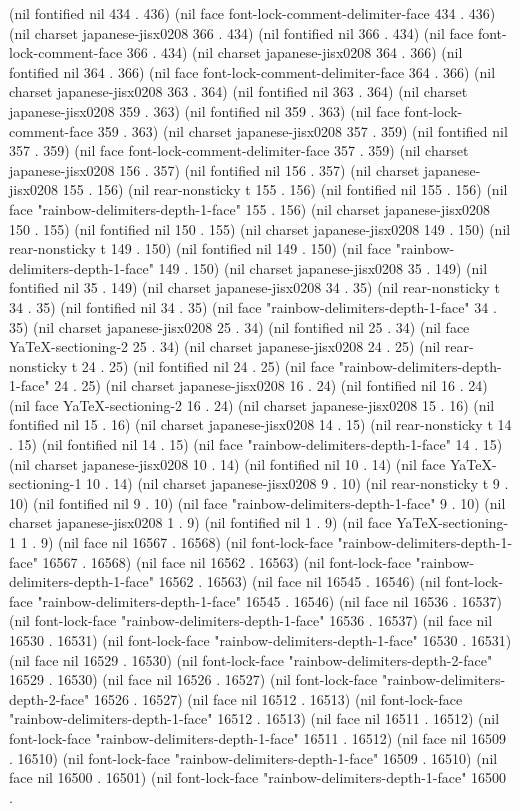 (nil fontified nil 434 . 436) (nil face font-lock-comment-delimiter-face 434 . 436) (nil charset japanese-jisx0208 366 . 434) (nil fontified nil 366 . 434) (nil face font-lock-comment-face 366 . 434) (nil charset japanese-jisx0208 364 . 366) (nil fontified nil 364 . 366) (nil face font-lock-comment-delimiter-face 364 . 366) (nil charset japanese-jisx0208 363 . 364) (nil fontified nil 363 . 364) (nil charset japanese-jisx0208 359 . 363) (nil fontified nil 359 . 363) (nil face font-lock-comment-face 359 . 363) (nil charset japanese-jisx0208 357 . 359) (nil fontified nil 357 . 359) (nil face font-lock-comment-delimiter-face 357 . 359) (nil charset japanese-jisx0208 156 . 357) (nil fontified nil 156 . 357) (nil charset japanese-jisx0208 155 . 156) (nil rear-nonsticky t 155 . 156) (nil fontified nil 155 . 156) (nil face "rainbow-delimiters-depth-1-face" 155 . 156) (nil charset japanese-jisx0208 150 . 155) (nil fontified nil 150 . 155) (nil charset japanese-jisx0208 149 . 150) (nil rear-nonsticky t 149 . 150) (nil fontified nil 149 . 150) (nil face "rainbow-delimiters-depth-1-face" 149 . 150) (nil charset japanese-jisx0208 35 . 149) (nil fontified nil 35 . 149) (nil charset japanese-jisx0208 34 . 35) (nil rear-nonsticky t 34 . 35) (nil fontified nil 34 . 35) (nil face "rainbow-delimiters-depth-1-face" 34 . 35) (nil charset japanese-jisx0208 25 . 34) (nil fontified nil 25 . 34) (nil face YaTeX-sectioning-2 25 . 34) (nil charset japanese-jisx0208 24 . 25) (nil rear-nonsticky t 24 . 25) (nil fontified nil 24 . 25) (nil face "rainbow-delimiters-depth-1-face" 24 . 25) (nil charset japanese-jisx0208 16 . 24) (nil fontified nil 16 . 24) (nil face YaTeX-sectioning-2 16 . 24) (nil charset japanese-jisx0208 15 . 16) (nil fontified nil 15 . 16) (nil charset japanese-jisx0208 14 . 15) (nil rear-nonsticky t 14 . 15) (nil fontified nil 14 . 15) (nil face "rainbow-delimiters-depth-1-face" 14 . 15) (nil charset japanese-jisx0208 10 . 14) (nil fontified nil 10 . 14) (nil face YaTeX-sectioning-1 10 . 14) (nil charset japanese-jisx0208 9 . 10) (nil rear-nonsticky t 9 . 10) (nil fontified nil 9 . 10) (nil face "rainbow-delimiters-depth-1-face" 9 . 10) (nil charset japanese-jisx0208 1 . 9) (nil fontified nil 1 . 9) (nil face YaTeX-sectioning-1 1 . 9) (nil face nil 16567 . 16568) (nil font-lock-face "rainbow-delimiters-depth-1-face" 16567 . 16568) (nil face nil 16562 . 16563) (nil font-lock-face "rainbow-delimiters-depth-1-face" 16562 . 16563) (nil face nil 16545 . 16546) (nil font-lock-face "rainbow-delimiters-depth-1-face" 16545 . 16546) (nil face nil 16536 . 16537) (nil font-lock-face "rainbow-delimiters-depth-1-face" 16536 . 16537) (nil face nil 16530 . 16531) (nil font-lock-face "rainbow-delimiters-depth-1-face" 16530 . 16531) (nil face nil 16529 . 16530) (nil font-lock-face "rainbow-delimiters-depth-2-face" 16529 . 16530) (nil face nil 16526 . 16527) (nil font-lock-face "rainbow-delimiters-depth-2-face" 16526 . 16527) (nil face nil 16512 . 16513) (nil font-lock-face "rainbow-delimiters-depth-1-face" 16512 . 16513) (nil face nil 16511 . 16512) (nil font-lock-face "rainbow-delimiters-depth-1-face" 16511 . 16512) (nil face nil 16509 . 16510) (nil font-lock-face "rainbow-delimiters-depth-1-face" 16509 . 16510) (nil face nil 16500 . 16501) (nil font-lock-face "rainbow-delimiters-depth-1-face" 16500 . 